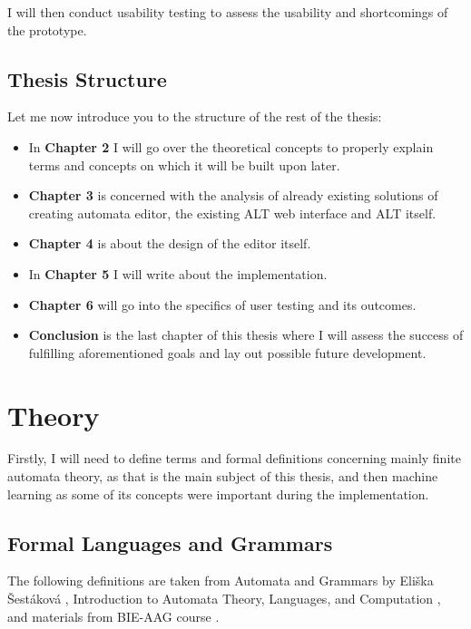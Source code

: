 I will then conduct usability testing to assess the usability and shortcomings of the prototype.

\section{Thesis Structure}

Let me now introduce you to the structure of the rest of the thesis:

\begin{itemize}
\item In \textbf{Chapter 2} I will go over the theoretical concepts to properly explain terms and concepts on which it will be built upon later.

\item \textbf{Chapter 3} is concerned with the analysis of already existing solutions of creating automata editor, the existing ALT web interface and ALT itself.

\item \textbf{Chapter 4} is about the design of the editor itself.

\item In \textbf{Chapter 5} I will write about the implementation.

\item \textbf{Chapter 6} will go into the specifics of user testing and its outcomes.

\item \textbf{Conclusion} is the last chapter of this thesis where I will assess the success of fulfilling aforementioned goals and lay out possible future development.

\end{itemize}

\chapter{Theory}
\label{chap:theory}

Firstly,  I will need to define terms and formal definitions concerning mainly finite automata theory, as that is the main subject of this thesis, and then machine learning as some of its concepts were important during the implementation. 

\section{Formal Languages and Grammars}
 
The following definitions are taken from Automata and Grammars by Eliška Šestáková \cite{automata-and-grammars}, Introduction to Automata Theory, Languages, and Computation \cite{introduction-automata}, and materials from BIE-AAG course \cite{lectures}.

